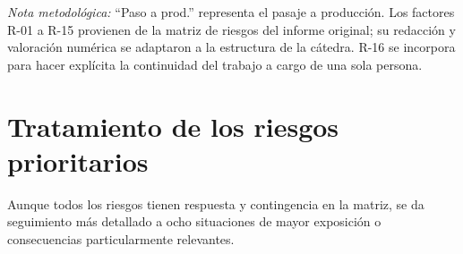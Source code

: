 \noindent\textit{Nota metodológica:} ``Paso a prod.'' representa el pasaje a producción. Los factores R-01 a R-15 provienen de la matriz de riesgos del informe original; su redacción y valoración numérica se adaptaron a la estructura de la cátedra. R-16 se incorpora para hacer explícita la continuidad del trabajo a cargo de una sola persona.

\section{Tratamiento de los riesgos prioritarios}\label{sec:ml-tratamiento-riesgos}

Aunque todos los riesgos tienen respuesta y contingencia en la matriz, se da seguimiento más detallado a ocho situaciones de mayor exposición o consecuencias particularmente relevantes.

